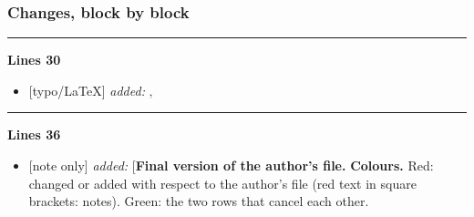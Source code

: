 \documentclass[10pt]{article}
\begin{document}
\subsubsection*{Changes, block by block}
\noindent\rule{\linewidth}{0.3pt}\par\noindent\textbf{Lines 30}\par
\begin{itemize}[leftmargin=2.2em,itemsep=1pt,topsep=2pt]
\item[\textbf{l.30}] \textsf{\small [typo/LaTeX]} \emph{added:} $\displaystyle ,$
\end{itemize}
\noindent\rule{\linewidth}{0.3pt}\par\noindent\textbf{Lines 36}\par
\begin{itemize}[leftmargin=2.2em,itemsep=1pt,topsep=2pt]
\item[\textbf{l.36}] \textsf{\small [note only]} \emph{added:} \noindent[\textbf{Final version of the author's file.} \textbf{Colours.} Red: changed or added with respect to the author's file (red text in square brackets: notes).  Green: the two rows that cancel each other.
\end{itemize}
\end{document}

